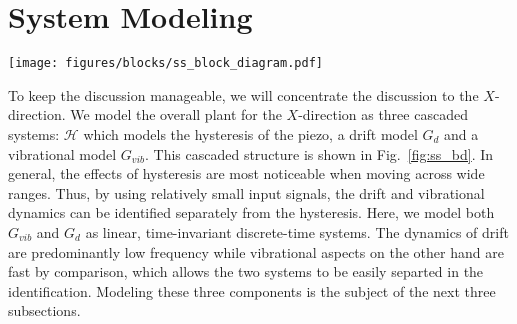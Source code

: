 \documentclass[journal,twocolumn,twoside]{IEEEtran}
\begin{document}
\section{System Modeling}
\begin{figure*}
  \centering  
  \texttt{[image: figures/blocks/ss\_block\_diagram.pdf]}
  \caption{The overall plant model consists of a vibrational component, $G_{vib}$, a drift model $G_{d}$ and a hysteresis model $\mathcal{H}[\cdot]$. }
  \label{fig:ss_bd}
\end{figure*}
To keep the discussion manageable, we will concentrate the discussion to the $X$-direction. We model the overall plant for the $X$-direction as three cascaded systems: $\mathcal{H}$ which models the hysteresis of the piezo, a drift model $G_d$ and a vibrational model $G_{vib}$. This cascaded structure is shown in Fig.~\ref{fig:ss_bd}. In general, the effects of hysteresis are most noticeable when moving across wide ranges. Thus, by using relatively small input signals, the drift and vibrational dynamics can be identified separately from the hysteresis. Here, we model both $G_{vib}$ and $G_d$ as linear, time-invariant discrete-time systems. The dynamics of drift are predominantly low frequency while vibrational aspects on the other hand are fast by comparison, which allows the two systems to be easily separted in the identification.
 Modeling these three components is the subject of the next three subsections.

%   
%   
\end{document}
